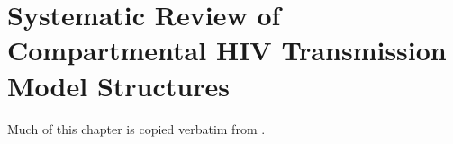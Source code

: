 \chapter{Systematic Review of Compartmental HIV Transmission Model Structures}\label{sr}
Much of this chapter is copied verbatim from \cite{Knight2022sr}.




\printchapterbibliography
